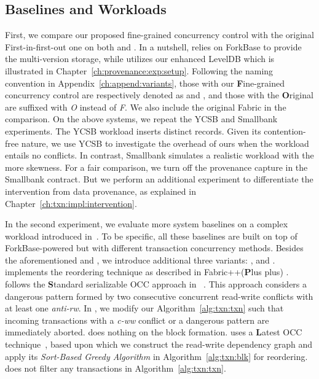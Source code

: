 \subsection{Baselines and Workloads}
First, we compare our proposed fine-grained concurrency control with the original First-in-first-out one on both {\fs} and {\fsPr}. 
In a nutshell, {\fs} relies on ForkBase to provide the multi-version storage, while {\fsPr} utilizes our enhanced LevelDB which is illustrated in Chapter~\ref{ch:provenance:exp:setup}. 
Following the naming convention in Appendix~\ref{ch:append:variants}, those with our \textbf{F}ine-grained concurrency control are respectively denoted as {\fsF} and {\fsPrF}, and those with the \textbf{O}riginal are suffixed with \textit{O} instead of \textit{F}. 
We also include the original Fabric in the comparison. 
On the above systems, we repeat the YCSB and Smallbank experiments. 
The YCSB workload inserts distinct records. 
Given its contention-free nature, we use YCSB to investigate the overhead of ours when the workload entails no conflicts. 
In contrast, Smallbank simulates a realistic workload with the more skewness.
For a fair comparison, we turn off the provenance capture in the Smallbank contract. 
But we perform an additional experiment to differentiate the intervention from data provenance, as explained in Chapter~\ref{ch:txn:impl:intervention}. 

In the second experiment, we evaluate more system baselines on a complex workload introduced in~\cite{sharma2019blurring}. 
To be specific, all these baselines are built on top of ForkBase-powered {\fs} but with different transaction concurrency methods.
Besides the aforementioned {\fsO} and {\fsF}, we introduce additional three variants: {\fsP}, {\fsL} and {\fsS}. 
{\fsP} implements the reordering technique as described in Fabric++(\textbf{P}lus plus) \cite{sharma2019blurring}.
{\fsS} follows the \textbf{S}tandard serializable OCC approach in ~\cite{CahillRF08}. 
This approach considers a dangerous pattern formed by two consecutive concurrent read-write conflicts with at least one \textit{anti-rw}. 
In {\fsS}, we modify our Algorithm~\ref{alg:txn:txn} such that incoming transactions with a \textit{c-ww} conflict or a dangerous pattern are immediately aborted. 
{\fsS} does nothing on the block formation.
{\fsL} uses a \textbf{L}atest OCC technique~\cite{ding2018improving}, based upon which we construct the read-write
dependency graph and apply its \textit{Sort-Based Greedy Algorithm} in Algorithm~\ref{alg:txn:blk} for reordering. 
{\fsL} does not filter any transactions in Algorithm~\ref{alg:txn:txn}.

